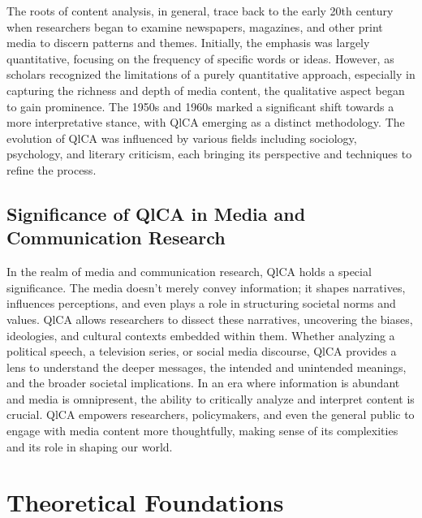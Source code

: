 \documentclass[
  b5paper]{book}
\begin{document}
The roots of content analysis, in general, trace back to the early 20th century when researchers began to examine newspapers, magazines, and other print media to discern patterns and themes. Initially, the emphasis was largely quantitative, focusing on the frequency of specific words or ideas. However, as scholars recognized the limitations of a purely quantitative approach, especially in capturing the richness and depth of media content, the qualitative aspect began to gain prominence. The 1950s and 1960s marked a significant shift towards a more interpretative stance, with QlCA emerging as a distinct methodology. The evolution of QlCA was influenced by various fields including sociology, psychology, and literary criticism, each bringing its perspective and techniques to refine the process.

\hypertarget{significance-of-qlca-in-media-and-communication-research}{%
\subsection*{Significance of QlCA in Media and Communication Research}\label{significance-of-qlca-in-media-and-communication-research}}

In the realm of media and communication research, QlCA holds a special significance. The media doesn't merely convey information; it shapes narratives, influences perceptions, and even plays a role in structuring societal norms and values. QlCA allows researchers to dissect these narratives, uncovering the biases, ideologies, and cultural contexts embedded within them. Whether analyzing a political speech, a television series, or social media discourse, QlCA provides a lens to understand the deeper messages, the intended and unintended meanings, and the broader societal implications. In an era where information is abundant and media is omnipresent, the ability to critically analyze and interpret content is crucial. QlCA empowers researchers, policymakers, and even the general public to engage with media content more thoughtfully, making sense of its complexities and its role in shaping our world.

\hypertarget{theoretical-foundations}{%
\section{Theoretical Foundations}\label{theoretical-foundations}}
\end{document}
